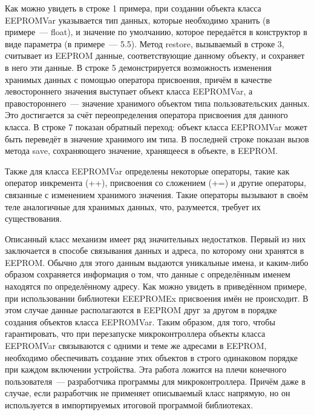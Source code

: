 



Как можно увидеть в строке 1 примера, при создании объекта класса EEPROMVar указывается тип данных, которые необходимо хранить (в примере~--- float), и значение по умолчанию, которое передаётся в конструктор в виде параметра (в примере~--- 5.5).
Метод restore, вызываемый в строке 3, считывает из EEPROM данные, соответствующие данному объекту, и сохраняет в него эти данные.
В строке 5 демонстрируется возможность изменения хранимых данных с помощью оператора присвоения, причём в качестве левостороннего значения выступает объект класса EEPROMVar, а правостороннего~--- значение хранимого объектом типа пользовательских данных.
Это достигается за счёт переопределения оператора присвоения для данного класса.
В строке 7 показан обратный переход: объект класса EEPROMVar может быть переведёт в значение хранимого им типа.
В последней строке показан вызов метода save, сохраняющего значение, хранящееся в объекте, в EEPROM.

Также для класса EEPROMVar определены некоторые операторы, такие как оператор инкремента (++), присвоения со сложением (+=) и другие операторы, связанные с изменением хранимого значения.
Такие операторы вызывают в своём теле аналогичные для хранимых данных, что, разумеется, требует их существования.

Описанный класс механизм имеет ряд значительных недостатков.
Первый из них заключается в способе связывания данных и адреса, по которому они хранятся в EEPROM.
Обычно для этого данным выдаются уникальные имена, и каким-либо образом сохраняется информация о том, что данные с определённым именем находятся по определённому адресу.
Как можно увидеть в приведённом примере, при использовании библиотеки EEEPROMEx присвоения имён не происходит.
В этом случае данные располагаются в EEPROM друг за другом в порядке создания объектов класса EEPROMVar.
Таким образом, для того, чтобы гарантировать, что при перезапуске микроконтроллера объекты класса EEPROMVar связываются с одними и теме же адресами в EEPROM, необходимо обеспечивать создание этих объектов в строго одинаковом порядке при каждом включении устройства.
Эта работа ложится на плечи конечного пользователя~--- разработчика программы для микроконтроллера.
Причём даже в случае, если разработчик не применяет описываемый класс напрямую, но он используется в импортируемых итоговой программой библиотеках.

